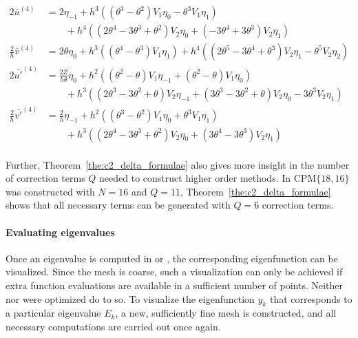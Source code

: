 \begin{align*}
    2\bar{u}^{(4)}            & = 2 \eta_{-1} + h^{3}\left(\left(\theta^{3} - \theta^{2}\right) V_{1} \eta_{0} -\theta^{3} V_{1} \eta_{1}\right)                                                                                                 \\
                              & \quad\quad + h^{4}\left(\left(2 \theta^{4} - 3 \theta^{3} + \theta^{2}\right) V_{2} \eta_{0} + \left(-3 \theta^{4} + 3 \theta^{3}\right) V_{2} \eta_{1}\right)                                                   \\
    \frac{2}{h}\bar{v}^{(4)}  & = 2 \theta \eta_{0} + h^{3}\left(\left(\theta^{4} - \theta^{3}\right) V_{1} \eta_{1}\right) + h^{4}\left(\left(2 \theta^{5} - 3 \theta^{4} + \theta^{3}\right) V_{2} \eta_{1} - \theta^{5} V_{2} \eta_{2}\right) \\
    2\bar{u'}^{(4)}           & = \frac{2Z}{h\theta} \eta_0 + h^{2}\left(\left(\theta^{2} - \theta\right) V_{1} \eta_{-1} + \left(\theta^{2} - \theta\right) V_{1} \eta_{0}\right)                                                               \\
                              & \quad\quad+ h^{3}\left(\left(2 \theta^{3} - 3 \theta^{2} + \theta\right) V_{2} \eta_{-1} + \left(3 \theta^{3} - 3 \theta^{2} + \theta\right) V_{2} \eta_{0} - 3 \theta^{3} V_{2} \eta_{1}\right)                 \\
    \frac{2}{h}\bar{v'}^{(4)} & = \frac{2}{h} \eta_{-1} + h^{2}\left(\left(\theta^{3} - \theta^{2}\right) V_{1} \eta_{0} + \theta^{3} V_{1} \eta_{1}\right)                                                                                      \\
                              & \quad\quad + h^{3}\left(\left(2 \theta^{4} - 3 \theta^{3} + \theta^{2}\right) V_{2} \eta_{0} + \left(3 \theta^{4} - 3 \theta^{3}\right) V_{2} \eta_{1}\right)                                                    \\
\end{align*}%

Further, Theorem~\ref{the:c2_delta_formulae} also gives more insight in the number of correction terms $Q$ needed to construct higher order methods. In  $\text{CPM}\{18, 16\}$ was constructed with $N=16$ and $Q=11$, Theorem~\ref{the:c2_delta_formulae} shows that all necessary terms can be generated with $Q=6$ correction terms.


\paragraph{Evaluating eigenvalues}
Once an eigenvalue is computed in \matslise{} or , the corresponding eigenfunction can be visualized. Since the mesh is coarse, such a visualization can only be achieved if extra function evaluations are available in a sufficient number of points. Neither \matslise{} nor  were optimized do to so. To visualize the eigenfunction $y_k$ that corresponds to a particular eigenvalue $E_k$, a new, sufficiently fine mesh is constructed, and all necessary computations are carried out once again.

